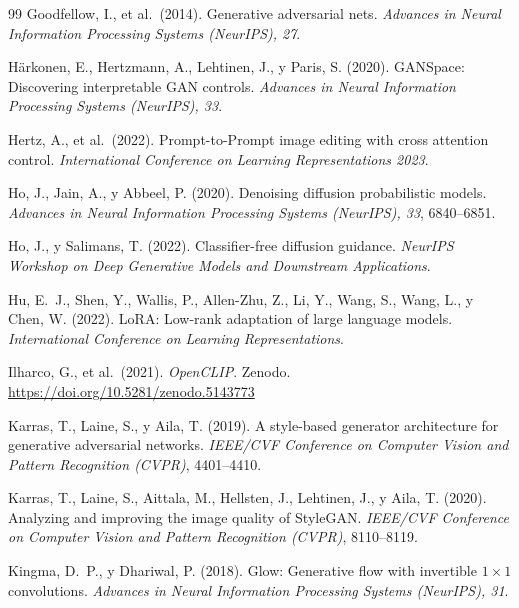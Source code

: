 \documentclass[12pt, a4paper, twoside]{book}
\begin{document}
\begin{thebibliography}{99}
Goodfellow, I., et al.\ (2014).
Generative adversarial nets.
\textit{Advances in Neural Information Processing Systems (NeurIPS), 27}.

H\"{a}rkonen, E., Hertzmann, A., Lehtinen, J., y Paris, S. (2020).
GANSpace: Discovering interpretable GAN controls.
\textit{Advances in Neural Information Processing Systems (NeurIPS), 33}.

Hertz, A., et al.\ (2022).
Prompt-to-Prompt image editing with cross attention control.
\textit{International Conference on Learning Representations 2023}.

Ho, J., Jain, A., y Abbeel, P. (2020).
Denoising diffusion probabilistic models.
\textit{Advances in Neural Information Processing Systems (NeurIPS), 33}, 6840--6851.

Ho, J., y Salimans, T. (2022).
Classifier-free diffusion guidance.
\textit{NeurIPS Workshop on Deep Generative Models and Downstream Applications}.

Hu, E.~J., Shen, Y., Wallis, P., Allen-Zhu, Z., Li, Y., Wang, S., Wang, L., y Chen, W. (2022).
LoRA: Low-rank adaptation of large language models.
\textit{International Conference on Learning Representations}.

Ilharco, G., et al.\ (2021).
\textit{OpenCLIP}.
Zenodo. \url{https://doi.org/10.5281/zenodo.5143773}

Karras, T., Laine, S., y Aila, T. (2019).
A style-based generator architecture for generative adversarial networks.
\textit{IEEE/CVF Conference on Computer Vision and Pattern Recognition (CVPR)}, 4401--4410.

Karras, T., Laine, S., Aittala, M., Hellsten, J., Lehtinen, J., y Aila, T. (2020).
Analyzing and improving the image quality of StyleGAN.
\textit{IEEE/CVF Conference on Computer Vision and Pattern Recognition (CVPR)}, 8110--8119.

Kingma, D.~P., y Dhariwal, P. (2018).
Glow: Generative flow with invertible $1{\times}1$ convolutions.
\textit{Advances in Neural Information Processing Systems (NeurIPS), 31}.


\end{thebibliography}
\end{document}
